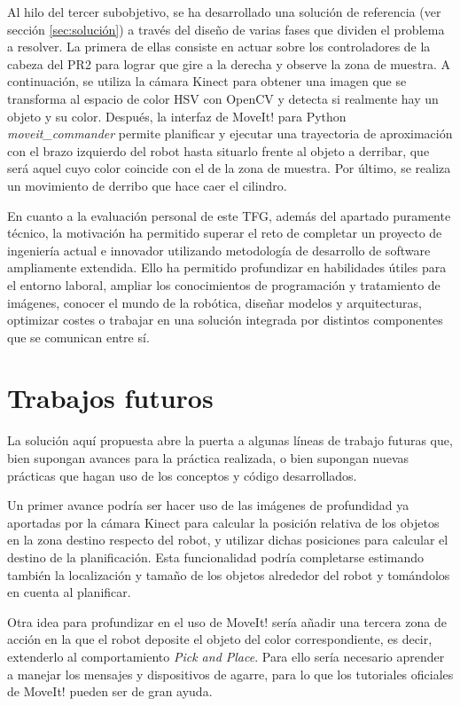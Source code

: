 \documentclass[12pt,spanish,chapterprefix, numbers=noenddot]{book}
\numberwithin{equation}{section}
\numberwithin{figure}{section}
\begin{document}
Al hilo del tercer subobjetivo, se ha desarrollado una solución de referencia (ver sección \ref{sec:solución}) a través del diseño de varias fases que dividen el problema a resolver. La primera de ellas consiste en actuar sobre los controladores de la cabeza del PR2 para lograr que gire a la derecha y observe la zona de muestra. A continuación, se utiliza la cámara Kinect para obtener una imagen que se transforma al espacio de color HSV con OpenCV y detecta si realmente hay un objeto y su color. Después, la interfaz de MoveIt! para Python \textit{moveit\_commander}  permite planificar y ejecutar una trayectoria de aproximación con el brazo izquierdo del robot hasta situarlo frente al objeto a derribar, que será aquel cuyo color coincide con el de la zona de muestra. Por último, se realiza un movimiento de derribo que hace caer el cilindro.

En cuanto a la evaluación personal de este TFG, además del apartado puramente técnico, la motivación ha permitido superar el reto de completar un proyecto de ingeniería actual e innovador utilizando metodología de desarrollo de software ampliamente extendida. Ello ha permitido profundizar en habilidades útiles para el entorno laboral, ampliar los conocimientos de programación y tratamiento de imágenes, conocer el mundo de la robótica, diseñar modelos y arquitecturas, optimizar costes o trabajar en una solución integrada por distintos componentes que se comunican entre sí.  

\section{Trabajos futuros}

La solución aquí propuesta abre la puerta a algunas líneas de trabajo futuras que, bien supongan avances para la práctica realizada, o bien supongan nuevas prácticas que hagan uso de los conceptos y código desarrollados. 

Un primer avance podría ser hacer uso de las imágenes de profundidad ya aportadas por la cámara Kinect para calcular la posición relativa de los objetos en la zona destino respecto del robot, y utilizar dichas posiciones para calcular el destino de la planificación. Esta funcionalidad podría completarse estimando también la localización y tamaño de los objetos alrededor del robot y tomándolos en cuenta al planificar. 

Otra idea para profundizar en el uso de MoveIt! sería añadir una tercera zona de acción en la que el robot deposite el objeto del color correspondiente, es decir, extenderlo al comportamiento \textit{Pick and Place}. Para ello sería necesario aprender a manejar los mensajes y dispositivos de agarre, para lo que los tutoriales oficiales de MoveIt! pueden ser de gran ayuda.
\end{document}
